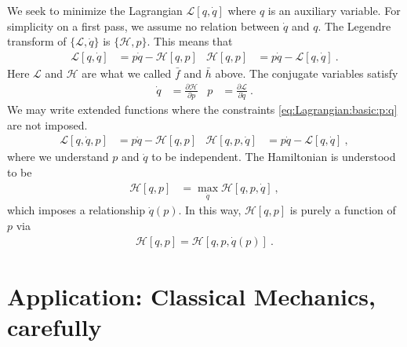 We seek to minimize the Lagrangian $\mathcal L[q,\dot q]$ where $q$ is an auxiliary variable. For simplicity on a first pass, we assume no relation between $\dot q$ and $q$. The Legendre transform of $\{\mathcal L, \dot q\}$ is $\{\mathcal H, p\}$. This means that
\begin{align}
    \mathcal L[q,\dot q] &= p\dot q - \mathcal H[q,p]
    &
    \mathcal H[q,p] &= p\dot q - \mathcal L[q,\dot q] \ .
\end{align}
Here $\mathcal L$ and $\mathcal H$ are what we called $\bar f$ and $\bar h$ above. The conjugate variables satisfy
\begin{align}
    \dot q &= \frac{\partial \mathcal H}{\partial p}
    &
    p &= \frac{\partial \mathcal L}{\partial \dot q} \ .
    \label{eq:Lagrangian:basic:p:q}
\end{align}
We may write extended functions where the constraints \eqref{eq:Lagrangian:basic:p:q} are not imposed. 
\begin{align}
    \mathcal L[q,\dot q, p] &= p\dot q - \mathcal H[q,p]
    &
    \mathcal H[q,p, \dot q] &= p\dot q - \mathcal L[q,\dot q] 
    \ ,
\end{align}
where we understand $p$ and $\dot q$ to be independent. The Hamiltonian is understood to be
\begin{align}
    \mathcal H[q,p] &= \max_{\dot q} \mathcal H[q,p,\dot q] \ ,
\end{align}
which imposes a relationship $\dot q(p)$. In this way, $\mathcal H[q,p]$ is purely a function of $p$ via
\begin{align}
    \mathcal H[q,p]
    =
    \mathcal H[q,p,\dot q(p)] \ .
\end{align}





\section{Application: Classical Mechanics, carefully}

